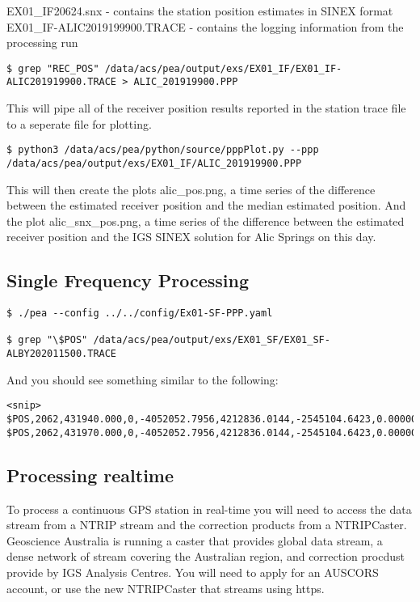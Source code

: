 EX01\_IF20624.snx              - contains the station position estimates in SINEX format
EX01\_IF-ALIC2019199900.TRACE  - contains the logging information from the processing run

\begin{verbatim}
$ grep "REC_POS" /data/acs/pea/output/exs/EX01_IF/EX01_IF-ALIC201919900.TRACE > ALIC_201919900.PPP
\end{verbatim}
This will pipe all of the receiver position results reported in the station trace file to a seperate file for plotting.
\begin{verbatim}
$ python3 /data/acs/pea/python/source/pppPlot.py --ppp /data/acs/pea/output/exs/EX01_IF/ALIC_201919900.PPP
\end{verbatim}
This will then create the plots alic\_pos.png, a time series of the difference between the estimated receiver position and the median estimated position.
And the plot alic\_snx\_pos.png, a time series of the difference between the estimated receiver position and the IGS SINEX solution for Alic Springs on this day.

\subsection{Single Frequency Processing} 
\begin{verbatim}
$ ./pea --config ../../config/Ex01-SF-PPP.yaml

$ grep "\$POS" /data/acs/pea/output/exs/EX01_SF/EX01_SF-ALBY202011500.TRACE
\end{verbatim}
And you should see something similar to the following:
\begin{verbatim}
<snip>
$POS,2062,431940.000,0,-4052052.7956,4212836.0144,-2545104.6423,0.00000043966020,0.00000039738502,0.00000013421476
$POS,2062,431970.000,0,-4052052.7956,4212836.0144,-2545104.6423,0.00000043965772,0.00000039738393,0.00000013421667
\end{verbatim}



\subsection{Processing realtime}
To process a continuous GPS station in real-time you will need to access the data stream from a NTRIP stream and the correction products from a NTRIPCaster.
Geoscience Australia is running a caster that provides global data stream, a dense network of stream covering the Australian region, and correction procdust provide by IGS Analysis Centres.
You will need to apply for an AUSCORS account, or use the new NTRIPCaster that streams using https.

